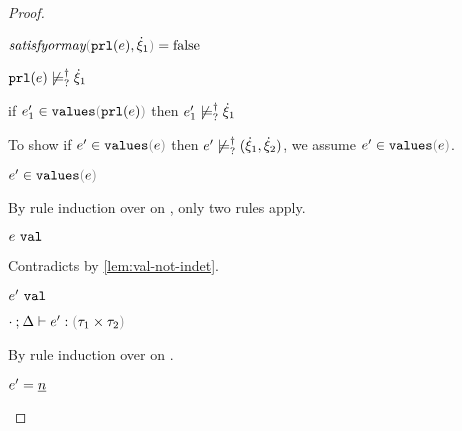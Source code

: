 \begin{proof}
\begin{byCases}
\begin{byCases}
\begin{byCases}
        \item[\false] 
        \begin{pfsteps*}
        \item $\fsatisfyormay{\hprl{e}}{\hxi_1}=\false$  
        \item $\mathtt{prl}(e) \not\models_{?}^{\dag} \dot{\xi}_1$  
        \item if $\inValues{e_1'}{\hprl{e}}$ then $e_1' \not\models_{?}^{\dag} \dot{\xi}_1$  
        \end{pfsteps*} 
        To show if $\inValues{e'}{e}$ then $e' \not\models_{?}^{\dag} (\dot{\xi}_1 , \dot{\xi}_2)$, we assume $\inValues{e'}{e}$.
        \begin{pfsteps*}
        \item $\inValues{e'}{e}$  
        \end{pfsteps*}
        By rule induction over  on , only two rules apply.
        \begin{byCases}
          \item[\text{(\ref{rule:IVVal})}]
          \begin{pfsteps*}
          \item $e ~\mathtt{val}$ 
          \end{pfsteps*} 
          Contradicts  by \autoref{lem:val-not-indet}.
          \item[\text{(\ref{rule:IVIndet})}] 
          \begin{pfsteps*}
          \item $e' ~\mathtt{val}$  
          \item $\hexptyp{\cdot}{\Delta}{e'}{\tprod{\tau_1}{\tau_2}}$  
          \end{pfsteps*}
          By rule induction over  on .
          \begin{byCases}
            \item[\text{(\ref{rule:VNum})}]
            \begin{pfsteps*}
            \item $e'=\underline{n}$ 

\end{pfsteps*}
\end{byCases}
\end{byCases}
\end{byCases}
\end{byCases}
\end{byCases}
\end{proof}
